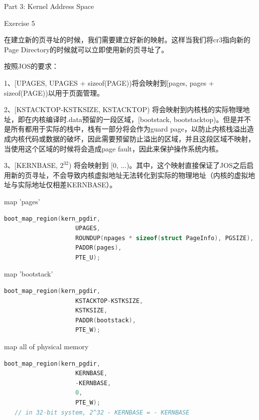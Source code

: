 \documentclass[GBK,winfonts,a4paper,10pt]{ctexart}
\begin{document}
\begin{section}{Part 3: Kernel Address Space}
\begin{subsection}{Exercise 5}
\par
在建立新的页寻址的时候，我们需要建立好新的映射。这样当我们将cr3指向新的Page Directory的时候就可以立即使用新的页寻址了。\par
按照JOS的要求：\par
1、[UPAGES, UPAGES + sizeof(PAGE))将会映射到[pages, pages + sizeof(PAGE))以用于页面管理。 \par
2、[KSTACKTOP-KSTKSIZE, KSTACKTOP) 将会映射到内核栈的实际物理地址，即在内核编译时.data预留的一段区域，[bootstack, bootstacktop)。但是并不是所有都用于实际的栈中，栈有一部分将会作为guard page，以防止内核栈溢出造成内核代码或数据的破坏，因此需要预留防止溢出的区域，并且这段区域不映射，当使用这个区域的时候将会造成page fault，因此来保护操作系统内核。\par
3、[KERNBASE, $2^{32}$) 将会映射到 [0, ...)。其中，这个映射直接保证了JOS之后启用新的页寻址，不会导致内核虚拟地址无法转化到实际的物理地址（内核的虚拟地址与实际地址仅相差KERNBASE）。\par

\begin{subsubsection}{map 'pages'}
\begin{lstlisting}[language=C]
    boot_map_region(kern_pgdir, 
                    UPAGES, 
                    ROUNDUP(npages * sizeof(struct PageInfo), PGSIZE), 
                    PADDR(pages),
                    PTE_U);
\end{lstlisting}
\end{subsubsection}

\begin{subsubsection}{map 'bootstack'}
\begin{lstlisting}[language=C]
	boot_map_region(kern_pgdir,
                    KSTACKTOP-KSTKSIZE,
                    KSTKSIZE,
                    PADDR(bootstack),
                    PTE_W);
\end{lstlisting}

\end{subsubsection}
\begin{subsubsection}{map all of physical memory}
\begin{lstlisting}[language=C]
	boot_map_region(kern_pgdir,
                    KERNBASE,
                    -KERNBASE,
                    0,
                    PTE_W); 
   // in 32-bit system, 2^32 - KERNBASE = - KERNBASE
\end{lstlisting}
\end{subsubsection}


\end{subsection}
\end{section}
\end{document}
